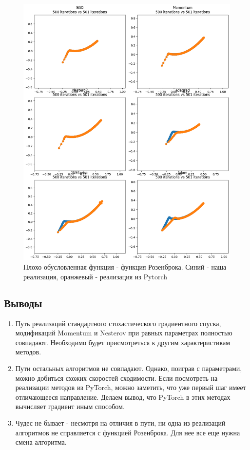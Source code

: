 \documentclass[a4paper,14pt,oneside,openany]{memoir}
\begin{document}
\begin{figure}[ht]
	\centering
	\includegraphics[width=1\textwidth]{img/4_1_2.png}
	\caption{Плохо обусловленная функция - функция Розенброка. Синий - наша реализация, оранжевый - реализация из Pytorch}
\end{figure}
\clearpage
\subsection{Выводы}
\begin{enumerate}
\item Путь реализаций стандартного стохастического градиентного спуска, модификаций Momentum и Nesterov при равных параметрах полностью совпадают. Необходимо будет присмотреться к другим характеристикам методов.
\item Пути остальных алгоритмов не совпадают. Однако, поиграв с параметрами, можно добиться схожих скоростей сходимости. Если посмотреть на реализации методов из PyTorch, можно заметить, что уже первый шаг имеет отличающееся направление. Делаем вывод, что PyTorch в этих методах вычисляет градиент иным способом.
\item Чудес не бывает - несмотря на отличия в пути, ни одна из реализаций алгоритмов не справляется с функцией Розенброка. Для нее все еще нужна смена алгоритма.
\end{enumerate}
\end{document}
